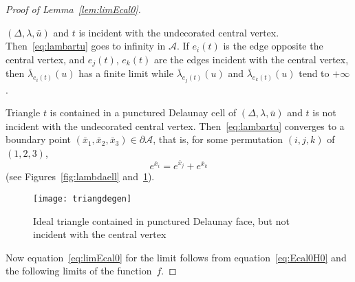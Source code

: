 \documentclass[a4paper, 11pt]{article}
\newcommand{\lambar}{\bar{\lambda}}
\newcommand{\Acal}{\mathcal{A}}
\newcommand{\ubar}{\bar{u}}
\newcommand{\xbar}{\bar{x}}
\theoremstyle{plain}
\theoremstyle{definition}
\begin{document}
\begin{proof}[Proof of Lemma~\ref{lem:limEcal0}]
\begin{compactenum}[(i)]
    $(\Delta,\lambda,\ubar)$ and $t$ is incident with the undecorated
    central vertex. Then~\eqref{eq:lambartu} goes to infinity in
    $\Acal$. If $e_{i}(t)$ is the edge opposite the central vertex,
    and $e_{j}(t)$, $e_{k}(t)$ are the edges incident with the central
    vertex, then $\lambar_{e_{i}(t)}(u)$ has a finite limit while
    $\lambar_{e_{j}(t)}(u)$ and $\lambar_{e_{k}(t)}(u)$ tend to
    $+\infty$.
  \item Triangle $t$ is contained in a punctured Delaunay cell of
    $(\Delta,\lambda,\ubar)$ and $t$ is not incident with the
    undecorated central vertex. Then~\eqref{eq:lambartu} converges to
    a boundary point $(\xbar_{1},\xbar_{2},\xbar_{3})\in\partial\!\Acal$, that is,
    for some permutation $(i,j,k)$ of $(1,2,3)$,
    \begin{equation*}
      e^{\xbar_{i}}=
      e^{\xbar_{j}}+
      e^{\xbar_{k}}
    \end{equation*}
    (see Figures~\ref{fig:lambdaell} and~\ref{fig:triangdegen}).
  \end{compactenum}
  \begin{figure}
    \centering
    \texttt{[image: triangdegen]}
    \caption{Ideal triangle contained in punctured Delaunay face, but
      not incident with the central vertex}
    \label{fig:triangdegen}
  \end{figure}

  Now equation~\eqref{eq:limEcal0} for the limit follows
  from equation~\eqref{eq:Ecal0H0} and the following limits
  of the function~$f$.


\end{proof}
\end{document}
